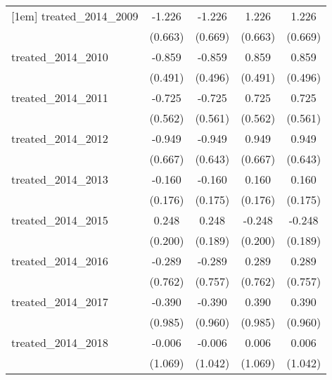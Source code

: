 {\begin{tabular}{l*{4}{c}}
[1em]
treated\_2014\_2009&      -1.226         &      -1.226         &       1.226         &       1.226         \\
            &     (0.663)         &     (0.669)         &     (0.663)         &     (0.669)         \\
[1em]
treated\_2014\_2010&      -0.859         &      -0.859         &       0.859         &       0.859         \\
            &     (0.491)         &     (0.496)         &     (0.491)         &     (0.496)         \\
[1em]
treated\_2014\_2011&      -0.725         &      -0.725         &       0.725         &       0.725         \\
            &     (0.562)         &     (0.561)         &     (0.562)         &     (0.561)         \\
[1em]
treated\_2014\_2012&      -0.949         &      -0.949         &       0.949         &       0.949         \\
            &     (0.667)         &     (0.643)         &     (0.667)         &     (0.643)         \\
[1em]
treated\_2014\_2013&      -0.160         &      -0.160         &       0.160         &       0.160         \\
            &     (0.176)         &     (0.175)         &     (0.176)         &     (0.175)         \\
[1em]
treated\_2014\_2015&       0.248         &       0.248         &      -0.248         &      -0.248         \\
            &     (0.200)         &     (0.189)         &     (0.200)         &     (0.189)         \\
[1em]
treated\_2014\_2016&      -0.289         &      -0.289         &       0.289         &       0.289         \\
            &     (0.762)         &     (0.757)         &     (0.762)         &     (0.757)         \\
[1em]
treated\_2014\_2017&      -0.390         &      -0.390         &       0.390         &       0.390         \\
            &     (0.985)         &     (0.960)         &     (0.985)         &     (0.960)         \\
[1em]
treated\_2014\_2018&      -0.006         &      -0.006         &       0.006         &       0.006         \\
            &     (1.069)         &     (1.042)         &     (1.069)         &     (1.042)         \\

\end{tabular}}

